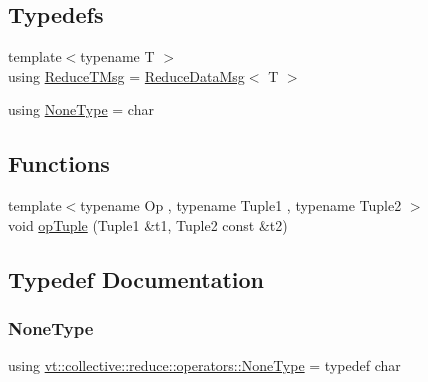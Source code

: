 \subsection*{Typedefs}
\begin{DoxyCompactItemize}
\item 
{\footnotesize template$<$typename T $>$ }\\using \hyperlink{namespacevt_1_1collective_1_1reduce_1_1operators_a85097552afc7e87d5d5092f068223ca0}{Reduce\+T\+Msg} = \hyperlink{structvt_1_1collective_1_1reduce_1_1operators_1_1_reduce_data_msg}{Reduce\+Data\+Msg}$<$ T $>$
\item 
using \hyperlink{namespacevt_1_1collective_1_1reduce_1_1operators_a1e8a587884de5e874a701ee300ca247c}{None\+Type} = char
\end{DoxyCompactItemize}
\subsection*{Functions}
\begin{DoxyCompactItemize}
\item 
{\footnotesize template$<$typename Op , typename Tuple1 , typename Tuple2 $>$ }\\void \hyperlink{namespacevt_1_1collective_1_1reduce_1_1operators_a697c168f0d6b5016d4673b6120c04212}{op\+Tuple} (Tuple1 \&t1, Tuple2 const \&t2)
\end{DoxyCompactItemize}


\subsection{Typedef Documentation}
\mbox{\label{namespacevt_1_1collective_1_1reduce_1_1operators_a1e8a587884de5e874a701ee300ca247c}} 
\subsubsection{\texorpdfstring{None\+Type}{NoneType}}
{\footnotesize\ttfamily using \hyperlink{namespacevt_1_1collective_1_1reduce_1_1operators_a1e8a587884de5e874a701ee300ca247c}{vt\+::collective\+::reduce\+::operators\+::\+None\+Type} = typedef char}

\mbox{\label{namespacevt_1_1collective_1_1reduce_1_1operators_a85097552afc7e87d5d5092f068223ca0}} 

